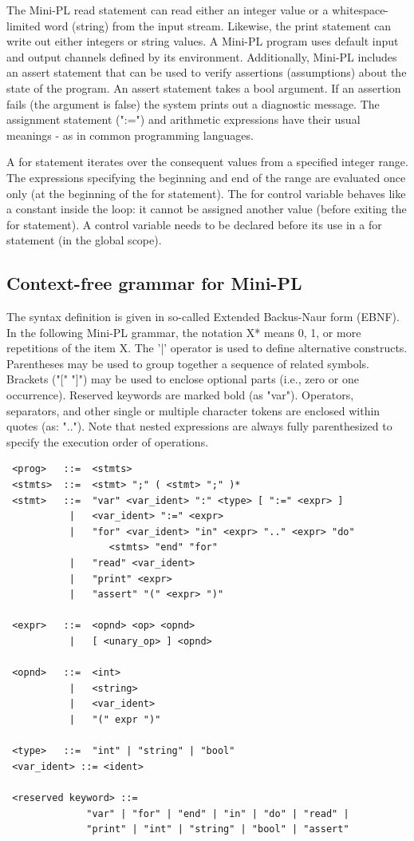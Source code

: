 \documentclass[english,11pt,twoside,a4paper]{article}
\begin{document}
The Mini-PL read statement can read either an integer value or a whitespace-limited word (string) from the input stream. Likewise, the print statement can write out either integers or string values. A Mini-PL program uses default input and output channels defined by its environment. Additionally, Mini-PL includes an assert statement that can be used to verify assertions (assumptions) about the state of the program. An assert statement takes a bool argument. If an assertion fails (the argument is false) the system prints out a diagnostic message. The assignment statement (":=") and arithmetic expressions have their usual meanings - as in common programming languages. 
 
A for statement iterates over the consequent values from a specified integer range. The expressions specifying the beginning and end of the range are evaluated once only (at the beginning of the for statement). The for control variable behaves like a constant inside the loop: it cannot be assigned another value (before exiting the for statement). A control variable needs to be declared before its use in a for statement (in the global scope).

\subsection{Context-free grammar for Mini-PL}

The syntax definition is given in so-called Extended Backus-Naur form (EBNF). In the following Mini-PL grammar, the notation X* means 0, 1, or more repetitions of the item X. The '|' operator is used to define alternative constructs. Parentheses may be used to group together a sequence of related symbols. Brackets ("[" "]") may be used to enclose optional parts (i.e., zero or one occurrence). Reserved keywords are marked bold (as "var"). Operators, separators, and other single or multiple character tokens are enclosed within quotes (as: ".."). Note that nested expressions are always fully parenthesized to specify the execution order of operations. 
 \begin{lstlisting}
 <prog>   ::=  <stmts>
 <stmts>  ::=  <stmt> ";" ( <stmt> ";" )*
 <stmt>   ::=  "var" <var_ident> ":" <type> [ ":=" <expr> ] 
           |   <var_ident> ":=" <expr>  
           |   "for" <var_ident> "in" <expr> ".." <expr> "do" 
                  <stmts> "end" "for"  
           |   "read" <var_ident>  
           |   "print" <expr>  
           |   "assert" "(" <expr> ")"

 <expr>   ::=  <opnd> <op> <opnd>
           |   [ <unary_op> ] <opnd>
		   
 <opnd>   ::=  <int>
           |   <string>
           |   <var_ident>
           |   "(" expr ")"
              
 <type>   ::=  "int" | "string" | "bool"
 <var_ident> ::= <ident>
 
 <reserved keyword> ::= 
              "var" | "for" | "end" | "in" | "do" | "read" | 
              "print" | "int" | "string" | "bool" | "assert"
   \end{lstlisting}          
\end{document}
